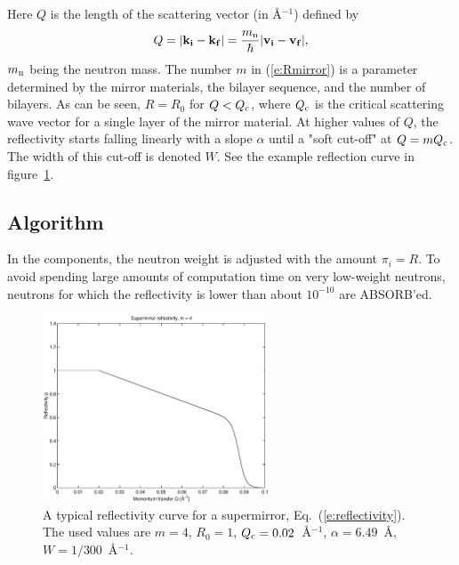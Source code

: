 Here $Q$ is the length of the scattering vector (in \AA$^{-1}$)
defined by
\begin{equation} \label{e:reflectivity}
Q = |{\bf k}_{\bf i} - {\bf k}_{\bf f}|
  = \frac{m_{\rm n}}{\hbar} |{\bf v}_{\bf i} - {\bf v}_{\bf f}|,
\end{equation}
$m_{\rm n}$ being the neutron mass.
The number $m$ in (\ref{e:Rmirror}) is a parameter determined by 
the mirror materials,
the bilayer sequence, and the number of bilayers.
As can be seen, $R=R_0$ for $Q < Q_{\rm c}$, where $Q_{\rm c}$ is the
critical scattering wave vector for a single layer of the mirror
material. At higher values of $Q$, the reflectivity starts falling
linearly with a slope $\alpha$ until a "soft cut-off" at $Q = m Q_{\rm c}$.
The width of this cut-off is denoted $W$. See the example reflection curve in
figure~\ref{f:reflectivity}.

\subsection{Algorithm}
In the components, the neutron weight is adjusted with the amount $\pi_i = R$.
To avoid spending large amounts of computation time on very low-weight
neutrons, neutrons for which the reflectivity is lower than about
$10^{-10}$ are ABSORB'ed.

\begin{figure}
  \begin{center}
    \includegraphics[width=0.6\textwidth]{figures/supermirror.eps}
  \end{center}
\caption{A typical reflectivity curve for a supermirror,
Eq.~(\protect\ref{e:reflectivity}). The used values are
$ m=4$, $R_0=1$, $Q_{\rm c} = 0.02$~\AA$^{-1}$, $\alpha = 6.49$~\AA,
$ W=1/300$~\AA$^{-1}$.
}
\label{f:reflectivity}
\end{figure}

\newpage

